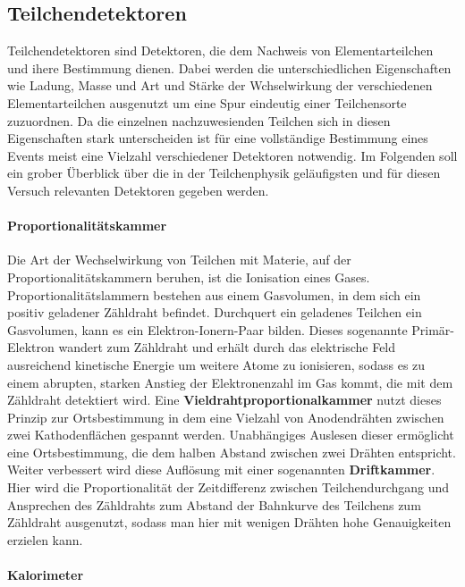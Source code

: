 \subsection{Teilchendetektoren}
Teilchendetektoren sind Detektoren, die dem Nachweis von Elementarteilchen und ihere Bestimmung dienen. Dabei werden die unterschiedlichen Eigenschaften wie Ladung, Masse und Art und Stärke der Wchselwirkung der verschiedenen Elementarteilchen ausgenutzt um eine Spur eindeutig einer Teilchensorte zuzuordnen. Da die einzelnen nachzuwesienden Teilchen sich in diesen Eigenschaften stark unterscheiden ist für eine vollständige Bestimmung eines Events meist eine Vielzahl verschiedener Detektoren notwendig. Im Folgenden soll ein grober Überblick über die in der Teilchenphysik geläufigsten und für diesen Versuch relevanten Detektoren gegeben werden. \cite{povh}

\paragraph{Proportionalitätskammer}
Die Art der Wechselwirkung von Teilchen mit Materie, auf der Proportionalitätskammern beruhen, ist die Ionisation eines Gases. Proportionalitätslammern bestehen aus einem Gasvolumen, in dem sich ein positiv geladener Zähldraht befindet. Durchquert ein geladenes Teilchen ein Gasvolumen, kann es ein Elektron-Ionern-Paar bilden. Dieses sogenannte Primär-Elektron wandert zum Zähldraht und erhält durch das elektrische Feld ausreichend kinetische Energie um weitere Atome zu ionisieren, sodass es zu einem abrupten, starken Anstieg der Elektronenzahl im Gas kommt, die mit dem Zähldraht detektiert wird. 
Eine \textbf{Vieldrahtproportionalkammer} nutzt dieses Prinzip zur Ortsbestimmung in dem eine Vielzahl von Anodendrähten zwischen zwei Kathodenflächen gespannt werden. Unabhängiges Auslesen dieser ermöglicht eine Ortsbestimmung, die dem halben Abstand zwischen zwei Drähten entspricht. Weiter verbessert wird diese Auflösung mit einer sogenannten \textbf{Driftkammer}. Hier wird die Proportionalität der Zeitdifferenz zwischen Teilchendurchgang und Ansprechen des Zähldrahts zum Abstand der Bahnkurve des Teilchens zum Zähldraht ausgenutzt, sodass man hier mit wenigen Drähten hohe Genauigkeiten erzielen kann. \cite{anleitungalt}

\paragraph{Kalorimeter}

